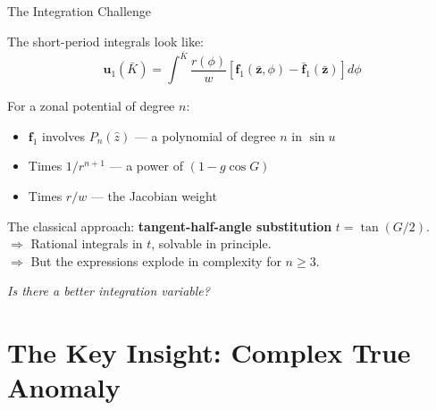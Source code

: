 \documentclass[aspectratio=169, 11pt]{beamer}
\begin{document}
\begin{frame}{The Integration Challenge}

The short-period integrals look like:
\[
\bm u_1(\bar K)
= \int^{\bar K}
\frac{r(\phi)}{w}
\left[
\bm f_1(\bar{\bm z}, \phi)
- \bar{\bm f}_1(\bar{\bm z})
\right] d\phi
\]

\vspace{-0.3em}
For a zonal potential of degree $n$:
\begin{itemize}\setlength{\itemsep}{0.1em}
    \item $\bm f_1$ involves $P_n(\hat z)$ ---
          a polynomial of degree $n$ in $\sin u$
    \item Times $1/r^{n+1}$ --- a power of $(1 - g\cos G)$
    \item Times $r/w$ --- the Jacobian weight
\end{itemize}

\vspace{0.3em}
The classical approach: \textbf{tangent-half-angle substitution}
$t = \tan(G/2)$.\\
$\Rightarrow$ Rational integrals in $t$, solvable in principle.\\
$\Rightarrow$ But the expressions \alert{explode in complexity} for $n \ge 3$.

\vspace{0.5em}
\begin{center}
\large
\textit{Is there a better integration variable?}
\end{center}

\end{frame}

\section{The Key Insight: Complex True Anomaly}
\end{document}
